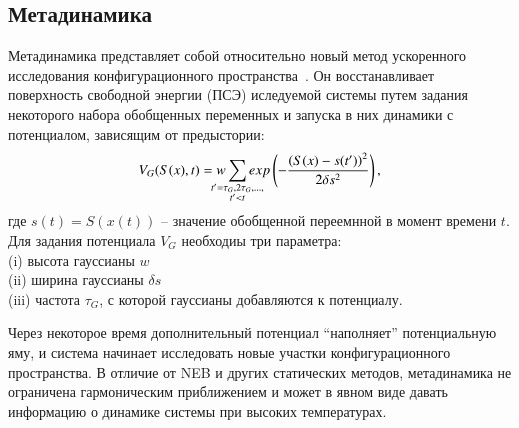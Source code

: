 \documentclass[master,14pt,subf,href,colorlinks=true
]{disser}
\begin{document}
\subsection{Метадинамика}\label{subsection_Metadynamics}
Метадинамика представляет собой относительно новый метод ускоренного исследования конфигурационного пространства~\cite{Metadynamics_2005,Metadynamics_2006,Metadynamics_2008}. Он восстанавливает поверхность свободной энергии (ПСЭ) иследуемой системы путем задания некоторого набора обобщенных переменных и запуска в них динамики с потенциалом, зависящим от предыстории:
\begin{equation}
V_G(S(x), t) = w \sum\limits_{\mathclap{\substack{t' = \tau_G, 2\tau_G,..., \\ t' < t}}} exp \left( - \frac{\left(S(x) - s(t')\right)^2}{2\delta s^2}\right),
\end{equation}
где  $s(t) = S(x(t))$ -- значение обобщенной переемнной в момент времени $t$. \\ Для задания потенциала $V_G$ необходиы три параметра:\\
(i) высота гауссианы $w$\\
(ii) ширина гауссианы $\delta s$\\
(iii) частота $\tau_G$, с которой гауссианы добавляются к потенциалу.

Через некоторое время дополнительный потенциал ``наполняет'' потенциальную яму, и система начинает исследовать новые участки конфигурационного пространства. В отличие от NEB и других статических методов, метадинамика не ограничена гармоническим приближением и может в явном виде давать информацию о динамике системы при высоких температурах.
\end{document}
